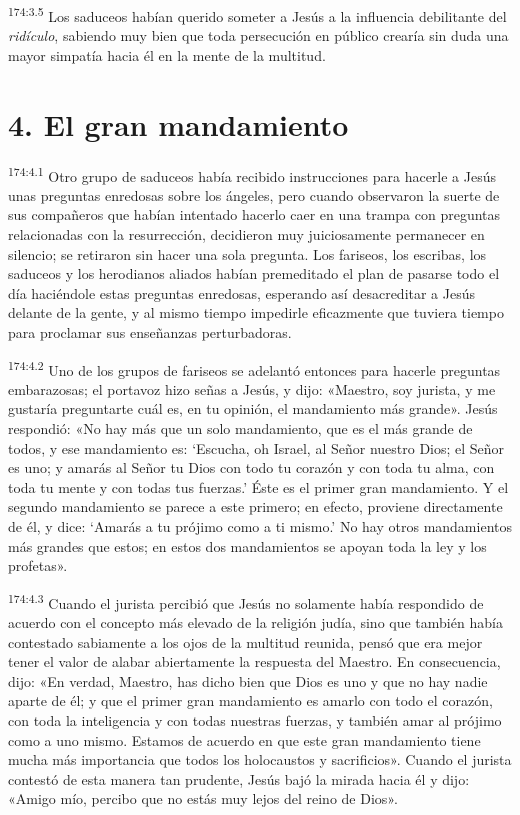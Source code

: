 \par 
\textsuperscript{174:3.5} Los saduceos habían querido someter a Jesús a la influencia debilitante del \textit{ridículo}, sabiendo muy bien que toda persecución en público crearía sin duda una mayor simpatía hacia él en la mente de la multitud.

\section*{4. El gran mandamiento}
\par 
\textsuperscript{174:4.1} Otro grupo de saduceos había recibido instrucciones para hacerle a Jesús unas preguntas enredosas sobre los ángeles, pero cuando observaron la suerte de sus compañeros que habían intentado hacerlo caer en una trampa con preguntas relacionadas con la resurrección, decidieron muy juiciosamente permanecer en silencio; se retiraron sin hacer una sola pregunta. Los fariseos, los escribas, los saduceos y los herodianos aliados habían premeditado el plan de pasarse todo el día haciéndole estas preguntas enredosas, esperando así desacreditar a Jesús delante de la gente, y al mismo tiempo impedirle eficazmente que tuviera tiempo para proclamar sus enseñanzas perturbadoras.

\par 
\textsuperscript{174:4.2} Uno de los grupos de fariseos se adelantó entonces para hacerle preguntas embarazosas; el portavoz hizo señas a Jesús, y dijo: «Maestro, soy jurista, y me gustaría preguntarte cuál es, en tu opinión, el mandamiento más grande». Jesús respondió: «No hay más que un solo mandamiento, que es el más grande de todos, y ese mandamiento es: `Escucha, oh Israel, al Señor nuestro Dios; el Señor es uno; y amarás al Señor tu Dios con todo tu corazón y con toda tu alma, con toda tu mente y con todas tus fuerzas.' Éste es el primer gran mandamiento. Y el segundo mandamiento se parece a este primero; en efecto, proviene directamente de él, y dice: `Amarás a tu prójimo como a ti mismo.' No hay otros mandamientos más grandes que estos; en estos dos mandamientos se apoyan toda la ley y los profetas».

\par 
\textsuperscript{174:4.3} Cuando el jurista percibió que Jesús no solamente había respondido de acuerdo con el concepto más elevado de la religión judía, sino que también había contestado sabiamente a los ojos de la multitud reunida, pensó que era mejor tener el valor de alabar abiertamente la respuesta del Maestro. En consecuencia, dijo: «En verdad, Maestro, has dicho bien que Dios es uno y que no hay nadie aparte de él; y que el primer gran mandamiento es amarlo con todo el corazón, con toda la inteligencia y con todas nuestras fuerzas, y también amar al prójimo como a uno mismo. Estamos de acuerdo en que este gran mandamiento tiene mucha más importancia que todos los holocaustos y sacrificios». Cuando el jurista contestó de esta manera tan prudente, Jesús bajó la mirada hacia él y dijo: «Amigo mío, percibo que no estás muy lejos del reino de Dios».

